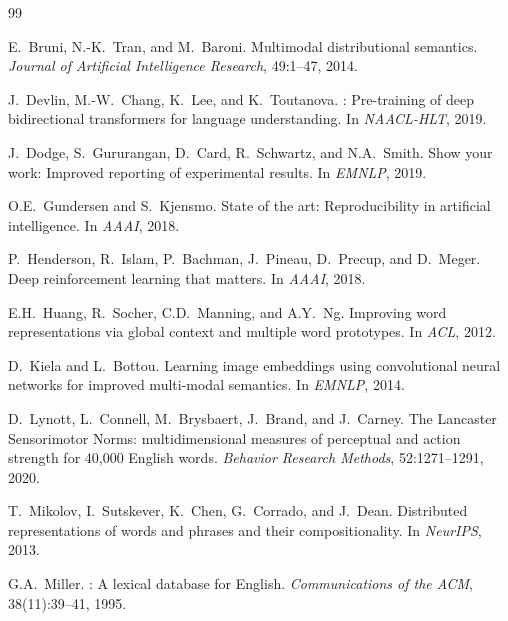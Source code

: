 \documentclass[twoside,11pt]{article}
\begin{document}

\begin{thebibliography}{99}

E.~Bruni, N.-K.~Tran, and M.~Baroni.
\newblock Multimodal distributional semantics.
\newblock \emph{Journal of Artificial Intelligence Research}, 49:1--47, 2014.

J.~Devlin, M.-W.~Chang, K.~Lee, and K.~Toutanova.
: Pre-training of deep bidirectional transformers for language understanding.
\newblock In \emph{NAACL-HLT}, 2019.

J.~Dodge, S.~Gururangan, D.~Card, R.~Schwartz, and N.A.~Smith.
\newblock Show your work: Improved reporting of experimental results.
\newblock In \emph{EMNLP}, 2019.

O.E.~Gundersen and S.~Kjensmo.
\newblock State of the art: Reproducibility in artificial intelligence.
\newblock In \emph{AAAI}, 2018.

P.~Henderson, R.~Islam, P.~Bachman, J.~Pineau, D.~Precup, and D.~Meger.
\newblock Deep reinforcement learning that matters.
\newblock In \emph{AAAI}, 2018.

E.H.~Huang, R.~Socher, C.D.~Manning, and A.Y.~Ng.
\newblock Improving word representations via global context and multiple word prototypes.
\newblock In \emph{ACL}, 2012.

D.~Kiela and L.~Bottou.
\newblock Learning image embeddings using convolutional neural networks for improved multi-modal semantics.
\newblock In \emph{EMNLP}, 2014.

D.~Lynott, L.~Connell, M.~Brysbaert, J.~Brand, and J.~Carney.
\newblock The Lancaster Sensorimotor Norms: multidimensional measures of perceptual and action strength for 40,000 English words.
\newblock \emph{Behavior Research Methods}, 52:1271--1291, 2020.

T.~Mikolov, I.~Sutskever, K.~Chen, G.~Corrado, and J.~Dean.
\newblock Distributed representations of words and phrases and their compositionality.
\newblock In \emph{NeurIPS}, 2013.

G.A.~Miller.
: A lexical database for {E}nglish.
\newblock \emph{Communications of the ACM}, 38(11):39--41, 1995.


\end{thebibliography}
\end{document}
